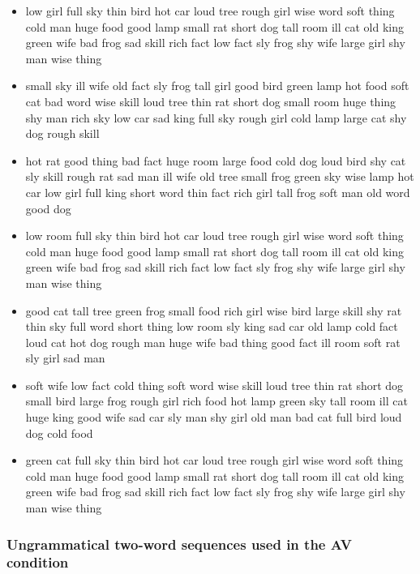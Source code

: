 \documentclass[10pt,letterpaper]{article}
\begin{document}
\begin{flushleft}
\begin{itemize}
  \item low
girl
full
sky
thin
bird
hot
car
loud
tree
rough
girl
wise
word
soft
thing
cold
man
huge
food
good
lamp
small
rat
short
dog
tall
room
ill
cat
old
king
green
wife
bad
frog
sad
skill
rich
fact
low
fact
sly
frog
shy
wife
large
girl
shy
man
wise
thing

  \item small
sky
ill
wife
old
fact
sly
frog
tall
girl
good
bird
green
lamp
hot
food
soft
cat
bad
word
wise
skill
loud
tree
thin
rat
short
dog
small
room
huge
thing
shy
man
rich
sky
low
car
sad
king
full
sky
rough
girl
cold
lamp
large
cat
shy
dog
rough
skill

  \item hot
rat
good
thing
bad
fact
huge
room
large
food
cold
dog
loud
bird
shy
cat
sly
skill
rough
rat
sad
man
ill
wife
old
tree
small
frog
green
sky
wise
lamp
hot
car
low
girl
full
king
short
word
thin
fact
rich
girl
tall
frog
soft
man
old
word
good
dog

  \item low
room
full
sky
thin
bird
hot
car
loud
tree
rough
girl
wise
word
soft
thing
cold
man
huge
food
good
lamp
small
rat
short
dog
tall
room
ill
cat
old
king
green
wife
bad
frog
sad
skill
rich
fact
low
fact
sly
frog
shy
wife
large
girl
shy
man
wise
thing

  \item good
cat
tall
tree
green
frog
small
food
rich
girl
wise
bird
large
skill
shy
rat
thin
sky
full
word
short
thing
low
room
sly
king
sad
car
old
lamp
cold
fact
loud
cat
hot
dog
rough
man
huge
wife
bad
thing
good
fact
ill
room
soft
rat
sly
girl
sad
man

  \item soft
wife
low
fact
cold
thing
soft
word
wise
skill
loud
tree
thin
rat
short
dog
small
bird
large
frog
rough
girl
rich
food
hot
lamp
green
sky
tall
room
ill
cat
huge
king
good
wife
sad
car
sly
man
shy
girl
old
man
bad
cat
full
bird
loud
dog
cold
food
  \item green
cat
full
sky
thin
bird
hot
car
loud
tree
rough
girl
wise
word
soft
thing
cold
man
huge
food
good
lamp
small
rat
short
dog
tall
room
ill
cat
old
king
green
wife
bad
frog
sad
skill
rich
fact
low
fact
sly
frog
shy
wife
large
girl
shy
man
wise
thing

\end{itemize}

\subsubsection{Ungrammatical two-word sequences used in the AV condition}


\end{flushleft}
\end{document}
